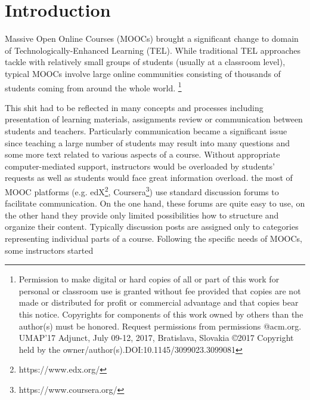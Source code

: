 \documentclass{sig-alternate}
\newcommand\blfootnote[1]{%
  \begingroup
  \renewcommand\thefootnote{}\footnote{#1}%
  \renewcommand{\footnotesize}{\scriptsize}
  \addtocounter{footnote}{-1}%
  \endgroup
}
\renewcommand{\footnotesize}{\scriptsize}
\begin{document}

\printccsdesc


\section{Introduction}
	Massive Open Online Courses (MOOCs) brought a significant change to domain of Technologically-Enhanced Learning (TEL). While traditional TEL approaches tackle with relatively small groups of students (usually at a classroom level), typical MOOCs involve large online communities consisting of thousands of students coming
from around the whole world. 
\blfootnote{Permission to make digital or hard copies of all or part of this work for personal or classroom use is granted without fee provided that copies are not made or distributed for profit or commercial advantage and that copies bear this notice. Copyrights for components of this work owned by others than the author(s) must be honored. Request permissions from permissions @acm.org. UMAP’17 Adjunct, July 09-12, 2017, Bratislava, Slovakia ©2017 Copyright held by the owner/author(s).DOI:10.1145/3099023.3099081} 
    This shit had to be reflected in many concepts and processes including presentation of learning materials, assignments review
or communication between students and teachers. 
	Particularly communication became a significant issue since teaching a large number of students may result into many questions
and some more text related to various aspects of a course. Without appropriate computer-mediated support, instructors would be overloaded by students’ requests as
well as students would face great information overload. the most of MOOC platforms (e.g. edX\footnote{https://www.edx.org/}, Coursera\footnote{https://www.coursera.org/}) use standard discussion forums to facilitate communication. On the one hand, these forums are quite easy to use, on the other hand they provide only limited possibilities how to structure and organize their content. Typically discussion posts are assigned only to categories representing individual parts of a course. Following the specific needs of MOOCs, some instructors started
\end{document}
